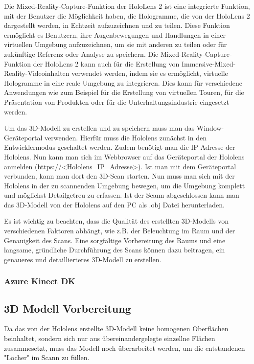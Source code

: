         Die Mixed-Reality-Capture-Funktion der HoloLens 2 ist eine integrierte Funktion, mit der Benutzer die Möglichkeit haben, die Hologramme, die von der HoloLens 2 dargestellt werden, in Echtzeit aufzuzeichnen und zu teilen. Diese Funktion ermöglicht es Benutzern, ihre Augenbewegungen und Handlungen in einer virtuellen Umgebung aufzuzeichnen, um sie mit anderen zu teilen oder für zukünftige Referenz oder Analyse zu speichern. Die Mixed-Reality-Capture-Funktion der HoloLens 2 kann auch für die Erstellung von Immersive-Mixed-Reality-Videoinhalten verwendet werden, indem sie es ermöglicht, virtuelle Hologramme in eine reale Umgebung zu integrieren. Dies kann für verschiedene Anwendungen wie zum Beispiel für die Erstellung von virtuellen Touren, für die Präsentation von Produkten oder für die Unterhaltungsindustrie eingesetzt werden.

        Um das 3D-Modell zu erstellen und zu speichern muss man das Window-Geräteportal verwenden. Hierfür muss die Hololens zunächst in den Entwicklermodus geschaltet werden. Zudem benötigt man die IP-Adresse der Hololens. Nun kann man sich im Webbrowser auf das Geräteportal der Hololens anmelden (https://<Hololens\_IP\_Adresse>). Ist man mit dem Geräteportal verbunden, kann man dort den 3D-Scan starten. Nun muss man sich mit der Hololens in der zu scannenden Umgebung bewegen, um die Umgebung komplett und möglichst Detailgetreu zu erfassen. Ist der Scann abgeschlossen kann man das 3D-Modell von der Hololens auf den PC als .obj Datei herunterladen.

        Es ist wichtig zu beachten, dass die Qualität des erstellten 3D-Modells von verschiedenen Faktoren abhängt, wie z.B. der Beleuchtung im Raum und der Genauigkeit des Scans. Eine sorgfältige Vorbereitung des Raums und eine langsame, gründliche Durchführung des Scans können dazu beitragen, ein genaueres und detaillierteres 3D-Modell zu erstellen.
        \subsubsection{Azure Kinect \ac{DK}} \label{kinect:subsubsection}

    \subsection{3D Modell Vorbereitung} \label{3d_modell_vorbereitung:subsection}
    Da das von der Hololens erstellte 3D-Modell keine homogenen Oberflächen beinhaltet, sondern sich nur aus übereinandergelegte einzellne Flächen zusammesetzt, muss das Modell noch überarbeitet werden, um die entstandenen "Löcher" im Scann zu füllen.

